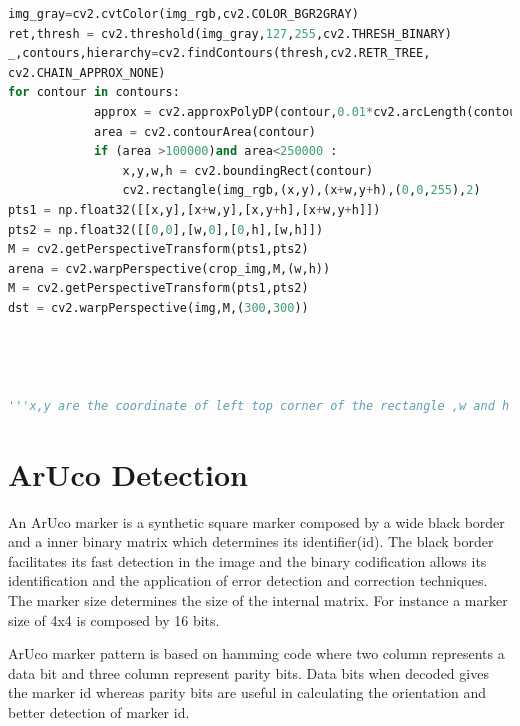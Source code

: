 \documentclass[main.tex]{subfiles}
\begin{document}
\begin{lstlisting}[language=Python, caption = Black Box area crop and perspective trasform]
img_gray=cv2.cvtColor(img_rgb,cv2.COLOR_BGR2GRAY)
ret,thresh = cv2.threshold(img_gray,127,255,cv2.THRESH_BINARY)
_,contours,hierarchy=cv2.findContours(thresh,cv2.RETR_TREE,
cv2.CHAIN_APPROX_NONE)
for contour in contours:            
            approx = cv2.approxPolyDP(contour,0.01*cv2.arcLength(contour,True),True)
            area = cv2.contourArea(contour)        
            if (area >100000)and area<250000 :                
                x,y,w,h = cv2.boundingRect(contour)
                cv2.rectangle(img_rgb,(x,y),(x+w,y+h),(0,0,255),2)
pts1 = np.float32([[x,y],[x+w,y],[x,y+h],[x+w,y+h]])
pts2 = np.float32([[0,0],[w,0],[0,h],[w,h]])
M = cv2.getPerspectiveTransform(pts1,pts2)
arena = cv2.warpPerspective(crop_img,M,(w,h))
M = cv2.getPerspectiveTransform(pts1,pts2) 
dst = cv2.warpPerspective(img,M,(300,300))                
                
                
                
                
'''x,y are the coordinate of left top corner of the rectangle ,w and h are width and height of rectangle respectively,dst is the transformed image'''

\end{lstlisting}
\pagebreak	


\section{ArUco Detection} 
An ArUco marker is a synthetic square marker composed by a wide black border and a inner binary matrix which determines its identifier(id). The black border facilitates its fast detection in the image and the binary codification allows its identification and the application of error detection and correction techniques. The marker size determines the size of the internal matrix. For instance a marker size of 4x4 is composed by 16 bits.

ArUco marker pattern is based on hamming code where two column represents a data bit and three column represent parity bits.
Data bits when decoded gives the marker id whereas parity bits are useful in calculating the orientation and better detection of marker id.\\
\end{document}
